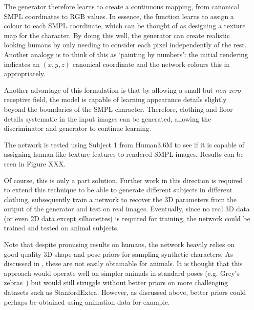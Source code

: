 The generator therefore learns to create a continuous mapping, from canonical SMPL coordinates to RGB values. In essence, the function learns to assign a colour to each SMPL coordinate, which can be thought of as designing a texture map for the character. By doing this well, the generator can create realistic looking humans by only needing to consider each pixel independently of the rest. Another analogy is to think of this as `painting by numbers': the initial rendering indicates an $(x,y,z)$ canonical coordinate and the network colours this in appropriately.

Another advantage of this formulation is that by allowing a small but \emph{non-zero} receptive field, the model is capable of learning appearance details slightly beyond the boundaries of the SMPL character. Therefore, clothing and floor details systematic in the input images can be generated, allowing the discriminator and generator to continue learning. 


The network is tested using Subject 1 from Human3.6M to see if it is capable of assigning human-like texture features to rendered SMPL images. Results can be seen in Figure XXX.



Of course, this is only a part solution. Further work in this direction is required to extend this technique to be able to generate different subjects in different clothing, subsequently train a network to recover the 3D parameters from the output of the generator and test on real images. Eventually, since no real 3D data (or even 2D data except silhouettes) is required for training, the network could be trained and tested on animal subjects. 

Note that despite promising results on humans, the network heavily relies on good quality 3D shape and pose priors for sampling synthetic characters. As discussed in , these are not easily obtainable for animals. It is thought that this approach would operate well on simpler animals in standard poses (e.g. Grey's zebras~) but would still struggle without better priors on more challenging datasets such as StanfordExtra. However, as discussed above, better priors could perhaps be obtained using animation data for example.

